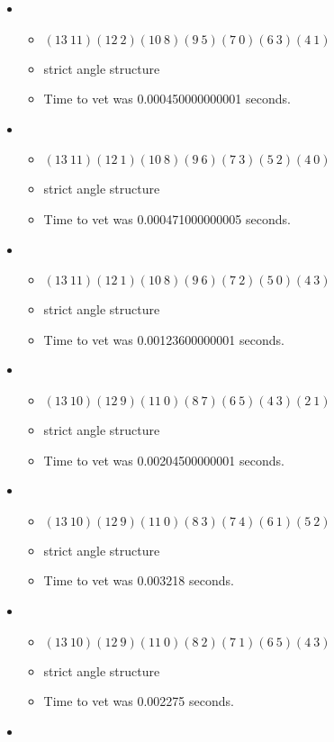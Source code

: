 \documentclass{article}
\begin{document}
\begin{itemize}
\begin{itemize}
\end{itemize}
\item \begin{itemize}
      \item $(13\ 11)(12\ 2)(10\ 8)(9\ 5)(7\ 0)(6\ 3)(4\ 1)$
      \item strict angle structure
      \item Time to vet was 0.000450000000001 seconds.
\end{itemize}
\item \begin{itemize}
      \item $(13\ 11)(12\ 1)(10\ 8)(9\ 6)(7\ 3)(5\ 2)(4\ 0)$
      \item strict angle structure
      \item Time to vet was 0.000471000000005 seconds.
\end{itemize}
\item \begin{itemize}
      \item $(13\ 11)(12\ 1)(10\ 8)(9\ 6)(7\ 2)(5\ 0)(4\ 3)$
      \item strict angle structure
      \item Time to vet was 0.00123600000001 seconds.
\end{itemize}
\item \begin{itemize}
      \item $(13\ 10)(12\ 9)(11\ 0)(8\ 7)(6\ 5)(4\ 3)(2\ 1)$
      \item strict angle structure
      \item Time to vet was 0.00204500000001 seconds.
\end{itemize}
\item \begin{itemize}
      \item $(13\ 10)(12\ 9)(11\ 0)(8\ 3)(7\ 4)(6\ 1)(5\ 2)$
      \item strict angle structure
      \item Time to vet was 0.003218 seconds.
\end{itemize}
\item \begin{itemize}
      \item $(13\ 10)(12\ 9)(11\ 0)(8\ 2)(7\ 1)(6\ 5)(4\ 3)$
      \item strict angle structure
      \item Time to vet was 0.002275 seconds.
\end{itemize}
\item \begin{itemize}

\end{itemize}
\end{itemize}
\end{document}
